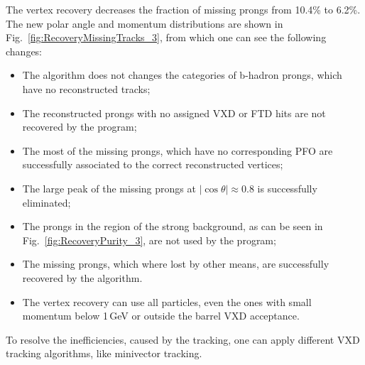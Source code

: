 The vertex recovery decreases the fraction of missing prongs from 10.4\% to 6.2\%. The new polar angle and momentum distributions are shown in Fig.~\ref{fig:RecoveryMissingTracks_3}, from which one can see the following changes:
\begin{itemize}
\item The algorithm does not changes the categories of b-hadron prongs, which have no reconstructed tracks;
\item The reconstructed prongs with no assigned VXD or FTD hits are not recovered by the program;
\item The most of the missing prongs, which have no corresponding PFO are successfully associated to the correct reconstructed vertices;
\item The large peak of the missing prongs at $|\cos\theta| \approx 0.8$ is successfully eliminated;
\item The prongs in the region of the strong background, as can be seen in Fig.~\ref{fig:RecoveryPurity_3}, are not used by the program;
\item The missing prongs, which where lost by other means, are successfully recovered by the algorithm.
\item The vertex recovery can use all particles, even the ones with small momentum below 1\,GeV or outside the barrel VXD acceptance. 
\end{itemize}

To resolve the inefficiencies, caused by the tracking, one can apply different VXD tracking algorithms, like minivector tracking. 

